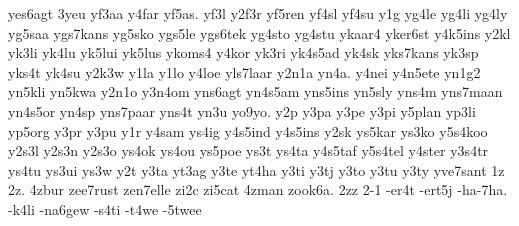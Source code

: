 yes6agt
3yeu
yf3aa
y4far
yf5as.
yf3l
y2f3r
yf5ren
yf4sl
yf4su
y1g
yg4le
yg4li
yg4ly
yg5saa
ygs7kans
yg5sko
ygs5le
ygs6tek
yg4sto
yg4stu
ykaar4
yker6st
y4k5ins
y2kl
yk3li
yk4lu
yk5lui
yk5lus
ykoms4
y4kor
yk3ri
yk4s5ad
yk4sk
yks7kans
yk3sp
yks4t
yk4su
y2k3w
y1la
y1lo
y4loe
yls7laar
y2n1a
yn4a.
y4nei
y4n5ete
yn1g2
yn5kli
yn5kwa
y2n1o
y3n4om
yns6agt
yn4s5am
yns5ins
yn5sly
yns4m
yns7maan
yn4s5or
yn4sp
yns7paar
yns4t
yn3u
yo9yo.
y2p
y3pa
y3pe
y3pi
y5plan
yp3li
yp5org
y3pr
y3pu
y1r
y4sam
ys4ig
y4s5ind
y4s5ins
y2sk
ys5kar
ys3ko
y5s4koo
y2s3l
y2s3n
y2s3o
ys4ok
ys4ou
ys5poe
ys3t
ys4ta
y4s5taf
y5s4tel
y4ster
y3s4tr
ys4tu
ys3ui
ys3w
y2t
y3ta
yt3ag
y3te
yt4ha
y3ti
y3tj
y3to
y3tu
y3ty
yve7sant
1z
2z.
4zbur
zee7rust
zen7elle
zi2c
zi5cat
4zman
zook6a.
2zz
2-1
-er4t
-ert5j
-ha-7ha.
-k4li
-na6gew
-s4ti
-t4we
-5twee
